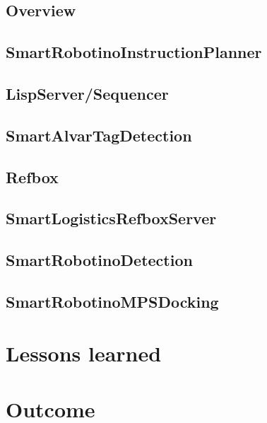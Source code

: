 \documentclass[12pt]{report}
\begin{document}
\section{Overview}
	
	
\section{SmartRobotinoInstructionPlanner}
	

\section{LispServer/Sequencer}
	
	
\section{SmartAlvarTagDetection}
	
	
\section{Refbox}


\section{SmartLogisticsRefboxServer}
	
	


\section{SmartRobotinoDetection}
	
	
\section{SmartRobotinoMPSDocking}
	

\chapter{Lessons learned}
    

\chapter{Outcome}
    

\printbibliography
\end{document}
